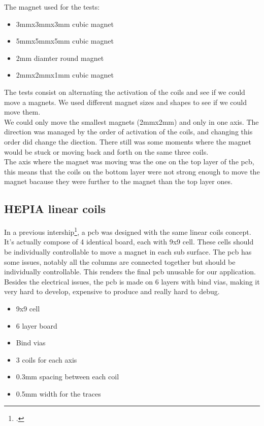 The magnet used for the tests:
\begin{itemize}
	\item 3mmx3mmx3mm cubic magnet
	\item 5mmx5mmx5mm cubic magnet
	\item 2mm diamter round magnet
	\item 2mmx2mmx1mm cubic magnet
\end{itemize}


The tests consist on alternating the activation of the coils and see if we could move a magnets. We used different magnet sizes and shapes to see if we could move them.
\\

We could only move the smallest magnets (2mmx2mm) and only in one axis. The direction was managed by the order of activation of the coils, and changing this order did change the diection. There still was some moments where the magnet would be stuck or moving back and forth on the same three coils.
\\

The axis where the magnet was moving was the one on the top layer of the \gls{pcb}, this means that the coils on the bottom layer were not strong enough to move the magnet bacause they were further to the magnet than the top layer ones.

\subsection{HEPIA linear coils}

In a previous intership\footcite{noauthor_arthurabelkalo_2023}, a \gls{pcb} was designed with the same linear coils concept. It's actually compose of 4 identical board, each with 9x9 cell. These cells should be individually controllable to move a magnet in each sub surface. The \gls{pcb} has some issues, notably all the columns are connected together but should be individually controllable. This renders the final \gls{pcb} unusable for our application.\\

Besides the electrical issues, the \gls{pcb} is made on 6 layers with bind vias, making it very hard to develop, expensive to produce and really hard to debug.

\begin{itemize}
	\item 9x9 cell
	\item 6 layer board
	\item Bind vias
	\item 3 coils for each axis
	\item 0.3mm spacing between each coil
	\item 0.5mm width for the traces
\end{itemize}

